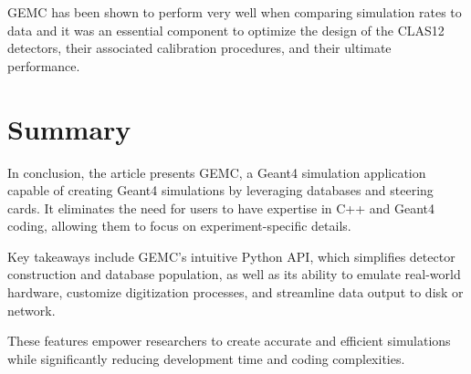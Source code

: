 GEMC has been shown to perform very well when comparing simulation rates to
data and it was an essential component to optimize the design of the CLAS12 detectors,
their associated calibration procedures, and their ultimate performance.

\section{Summary}
\label{sec:summary}

In conclusion, the article presents GEMC, a Geant4 simulation application
capable of creating Geant4 simulations by leveraging databases and steering cards.
It eliminates the need for users to have expertise in C++ and Geant4 coding,
allowing them to focus on experiment-specific details.

Key takeaways include GEMC's intuitive Python API, which simplifies detector
construction and database population, as well as its ability to emulate real-world
hardware, customize digitization processes, and streamline data output to disk or network.

These features empower researchers to create accurate and efficient simulations while significantly
reducing development time and coding complexities.